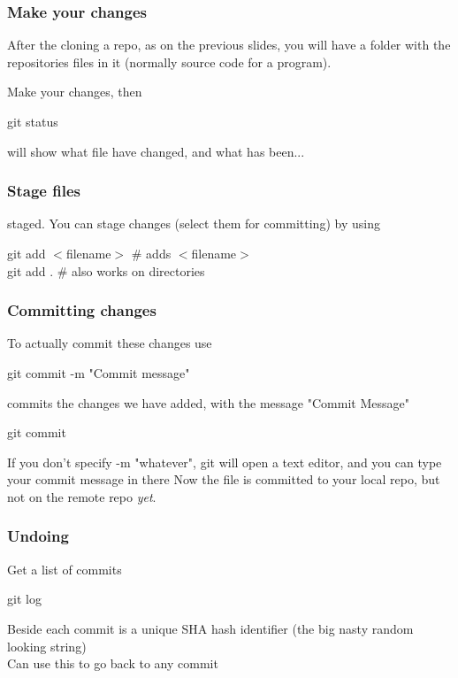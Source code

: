 \documentclass[xcolor=dvipsnames]{beamer}
\begin{document}
\begin{frame}
    \frametitle{Make your changes}
    After the cloning a repo, as on the previous slides, you will have a folder with the repositories
    files in it (normally source code for a program).

    Make your changes, then
    \begin{block}{}
        git status
    \end{block}
    will show what file have changed, and what has been...
\end{frame}

\begin{frame}
    \frametitle{Stage files}
    staged.
    You can stage changes (select them for committing) by using
    \begin{block}{}
        git add $<$filename$>$ \# adds $<$filename$>$\\
        git add . \# also works on directories
    \end{block}
\end{frame}

\begin{frame}
    \frametitle{Committing changes}
    To actually commit these changes use
    \begin{block}{}
        git commit -m "Commit message"
    \end{block}
    commits the changes we have added, with the message "Commit Message"\\
    
    \begin{block}{}    
        git commit
    \end{block}
     If you don't specify -m "whatever", git will open a text editor, and you can type your commit message in there 
    Now the file is committed to your local repo, but not on the remote repo \emph{yet}.
\end{frame}

\begin{frame}
    \frametitle{Undoing}

    Get a list of commits
    \begin{block}{}
        git log
    \end{block}

    Beside each commit is a unique SHA hash identifier (the big nasty random looking string)\\

    Can use this to go back to any commit
\end{frame}
\end{document}
